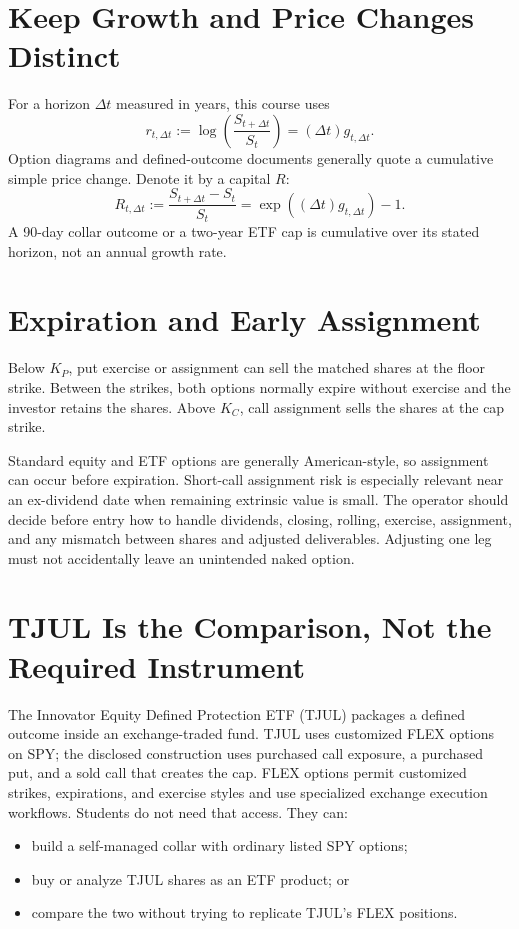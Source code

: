 \documentclass[11pt]{article}
\begin{document}
\section{Keep Growth and Price Changes Distinct}

For a horizon $\Delta t$ measured in years, this course uses
\begin{equation}
  \label{eq:growth-convention}
  r_{t,\Delta t}
  :=\log\!\left(\frac{S_{t+\Delta t}}{S_t}\right)
  =(\Delta t)g_{t,\Delta t}.
\end{equation}
Option diagrams and defined-outcome documents generally quote a cumulative
simple price change. Denote it by a capital $R$:
\begin{equation}
  \label{eq:simple-change}
  R_{t,\Delta t}
  :=\frac{S_{t+\Delta t}-S_t}{S_t}
  =\exp\!\left((\Delta t)g_{t,\Delta t}\right)-1.
\end{equation}
A 90-day collar outcome or a two-year ETF cap is cumulative over its stated
horizon, not an annual growth rate.

\section{Expiration and Early Assignment}

Below $K_P$, put exercise or assignment can sell the matched shares at the floor
strike. Between the strikes, both options normally expire without exercise and
the investor retains the shares. Above $K_C$, call assignment sells the shares
at the cap strike.

Standard equity and ETF options are generally American-style, so assignment can
occur before expiration. Short-call assignment risk is especially relevant near
an ex-dividend date when remaining extrinsic value is small. The operator should
decide before entry how to handle dividends, closing, rolling, exercise,
assignment, and any mismatch between shares and adjusted deliverables. Adjusting
one leg must not accidentally leave an unintended naked option.

\section{TJUL Is the Comparison, Not the Required Instrument}

The Innovator Equity Defined Protection ETF (TJUL) packages a defined outcome
inside an exchange-traded fund. TJUL uses customized FLEX options on SPY; the
disclosed construction uses purchased call exposure, a purchased put, and a
sold call that creates the cap. FLEX options permit customized strikes,
expirations, and exercise styles and use specialized exchange execution
workflows. Students do not need that access. They can:
\begin{itemize}[leftmargin=1.3em,itemsep=2pt,topsep=2pt]
  \item build a self-managed collar with ordinary listed SPY options;
  \item buy or analyze TJUL shares as an ETF product; or
  \item compare the two without trying to replicate TJUL's FLEX positions.
\end{itemize}
\end{document}
